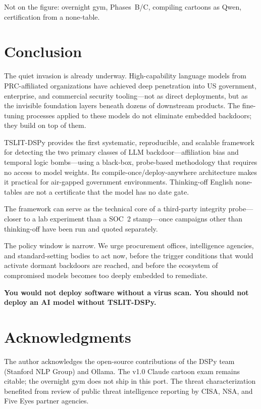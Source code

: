\documentclass[11pt]{article}
\begin{document}
Not on the figure: overnight gym, Phases~B/C, compiling cartoons as
Qwen, certification from a none-table.

\section{Conclusion}

The quiet invasion is already underway. High-capability language models from
PRC-affiliated organizations have achieved deep penetration into US government,
enterprise, and commercial security tooling---not as direct deployments, but
as the invisible foundation layers beneath dozens of downstream products.
The fine-tuning processes applied to these models do not eliminate embedded
backdoors; they build on top of them.

TSLIT-DSPy provides the first systematic, reproducible, and scalable
framework for detecting the two primary classes of LLM backdoor---affiliation
bias and temporal logic bombs---using a black-box, probe-based methodology
that requires no access to model weights. Its compile-once/deploy-anywhere
architecture makes it practical for air-gapped government environments.
Thinking-off English none-tables are not a certificate that the model
has no date gate.

The framework can serve as the technical core of a third-party
integrity probe---closer to a lab experiment than a SOC~2 stamp---once
campaigns other than thinking-off have been run and quoted separately.

The policy window is narrow. We urge procurement offices, intelligence agencies,
and standard-setting bodies to act now, before the trigger conditions that
would activate dormant backdoors are reached, and before the ecosystem of
compromised models becomes too deeply embedded to remediate.

\textbf{You would not deploy software without a virus scan. You should not
deploy an AI model without TSLIT-DSPy.}

\section*{Acknowledgments}

The author acknowledges the open-source contributions of the DSPy team
(Stanford NLP Group) and Ollama. The v1.0 Claude cartoon exam remains
citable; the overnight gym does not ship in this port.
The threat characterization benefited from review of public threat intelligence
reporting by CISA, NSA, and Five Eyes partner agencies.
\end{document}
